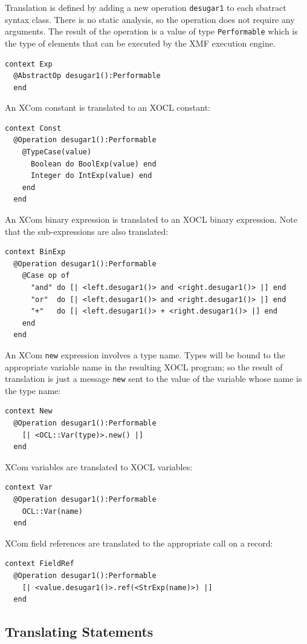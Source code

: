 \documentclass{article}
\begin{document}
Translation is defined by adding a new operation {\tt desugar1} to each sbatract syntax class.
There is no static analysis, so the operation does not require any arguments. The result of
the operation is a value of type {\tt Performable} which is the type of elements that can be
executed by the XMF execution engine.
\begin{verbatim}
context Exp
  @AbstractOp desugar1():Performable
  end
\end{verbatim}
An XCom constant is translated to an XOCL constant:
\begin{verbatim}
context Const
  @Operation desugar1():Performable
    @TypeCase(value)
      Boolean do BoolExp(value) end
      Integer do IntExp(value) end
    end
  end
\end{verbatim}
An XCom binary expression is translated to an XOCL binary expression. Note that the sub-expressions
are also translated:
\begin{verbatim}
context BinExp
  @Operation desugar1():Performable
    @Case op of
      "and" do [| <left.desugar1()> and <right.desugar1()> |] end
      "or"  do [| <left.desugar1()> and <right.desugar1()> |] end
      "+"   do [| <left.desugar1()> + <right.desugar1()> |] end
    end
  end
\end{verbatim}
An XCom {\tt new} expression involves a type name. Types will be bound to the appropriate variable
name in the resulting XOCL program; so the result of translation is just a message {\tt new} sent
to the value of the variable whose name is the type name:
\begin{verbatim}
context New
  @Operation desugar1():Performable
    [| <OCL::Var(type)>.new() |]
  end
\end{verbatim}
XCom variables are translated to XOCL variables:
\begin{verbatim}
context Var
  @Operation desugar1():Performable
    OCL::Var(name)
  end
\end{verbatim}
XCom field references are translated to the appropriate call on a record:
\begin{verbatim}
context FieldRef
  @Operation desugar1():Performable
    [| <value.desugar1()>.ref(<StrExp(name)>) |]
  end
\end{verbatim}

\subsection{Translating Statements}
\end{document}
